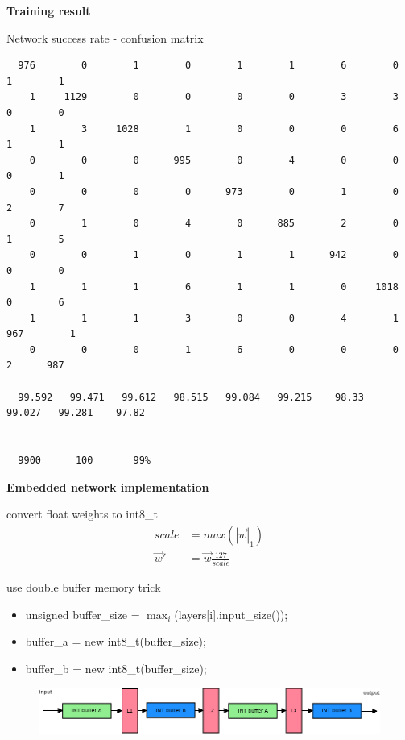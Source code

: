 \documentclass[xcolor=dvipsnames]{beamer}
\begin{document}
\begin{frame}[fragile]
{\bf Training result}

Network success rate - confusion matrix

{\tiny
  \begin{verbatim}
  976        0        1        0        1        1        6        0        1        1
    1     1129        0        0        0        0        3        3        0        0
    1        3     1028        1        0        0        0        6        1        1
    0        0        0      995        0        4        0        0        0        1
    0        0        0        0      973        0        1        0        2        7
    0        1        0        4        0      885        2        0        1        5
    0        0        1        0        1        1      942        0        0        0
    1        1        1        6        1        1        0     1018        0        6
    1        1        1        3        0        0        4        1      967        1
    0        0        0        1        6        0        0        0        2      987

  99.592   99.471   99.612   98.515   99.084   99.215    98.33   99.027   99.281    97.82


  9900      100       99%
  \end{verbatim}
}

\end{frame}




\begin{frame}{\bf Embedded network implementation}

convert float weights to int8\_t
\begin{align*}
  scale &= max{(|\vec{w}|_1)} \\
  \vec{w}' &= \vec{w}\frac{127}{scale}
\end{align*}


use double buffer memory trick

\begin{itemize}
  \item unsigned buffer\_size = $\max_{i}$(layers[i].input\_size());
  \item buffer\_a = new int8\_t(buffer\_size);
  \item buffer\_b = new int8\_t(buffer\_size);
\end{itemize}

\begin{figure}
  \includegraphics[scale=0.3]{../../diagrams/nn_memory.png}
\end{figure}

\end{frame}
\end{document}
